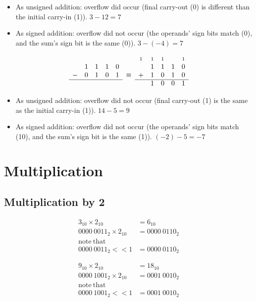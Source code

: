\documentclass{article}
\newcommand{\carry}{\scriptstyle 1}
\begin{document}
\begin{itemize}
\item As unsigned addition: overflow did occur (final carry-out (0) is
    different than the initial carry-in (1)). $3-12=7$
\item As signed addition: overflow did not occur (the operands' sign bits
    match (0), and the sum's sign bit is the same (0)). $3-(-4)=7$
\end{itemize}

\begin{equation*}\begin{array}{ccccccccccc}
  &   &   &   &   &        & \carry & \carry & \carry &   & \carry \\
  & 1 & 1 & 1 & 0 &        &   & 1 & 1 & 1 & 0 \\
- & 0 & 1 & 0 & 1 & \equiv & + & 1 & 0 & 1 & 0 \\ \cline{1-5}\cline{7-11}
  &   &   &   &   &        &   & 1 & 0 & 0 & 1
\end{array}\end{equation*}

\begin{itemize}
\item As unsigned addition: overflow did not occur (final carry-out (1) is the
    same as the initial carry-in (1)). $14-5=9$
\item As signed addition: overflow did not occur (the operands' sign bits
    match (10), and the sum's sign bit is the same (1)). $(-2)-5=-7$
\end{itemize}


\section{Multiplication}

\subsection{Multiplication by 2}

\begin{align*}
3_{10} \times 2_{10} &= 6_{10} \\
0000\ 0011_2 \times 2_{10} &= 0000\ 0110_2 \\
\mathrm{note\ that} & \\
0000\ 0011_2 << 1 &= 0000\ 0110_2
\end{align*}

\begin{align*}
9_{10} \times 2_{10} &= 18_{10} \\
0000\ 1001_2 \times 2_{10} &= 0001\ 0010_2 \\
\mathrm{note\ that} & \\
0000\ 1001_2 << 1 &= 0001\ 0010_2
\end{align*}
\end{document}
